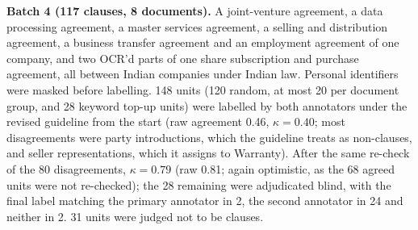 \documentclass[conference]{IEEEtran}
\begin{document}
\textbf{Batch 4 (117 clauses, 8 documents).} A joint-venture agreement, a data processing agreement, a master services agreement, a selling and distribution agreement, a business transfer agreement and an employment agreement of one company, and two OCR'd parts of one share subscription and purchase agreement, all between Indian companies under Indian law. Personal identifiers were masked before labelling. 148 units (120 random, at most 20 per document group, and 28 keyword top-up units) were labelled by both annotators under the revised guideline from the start (raw agreement 0.46, $\kappa=0.40$; most disagreements were party introductions, which the guideline treats as non-clauses, and seller representations, which it assigns to Warranty). After the same re-check of the 80 disagreements, $\kappa=0.79$ (raw 0.81; again optimistic, as the 68 agreed units were not re-checked); the 28 remaining were adjudicated blind, with the final label matching the primary annotator in 2, the second annotator in 24 and neither in 2. 31 units were judged not to be clauses.
\end{document}
